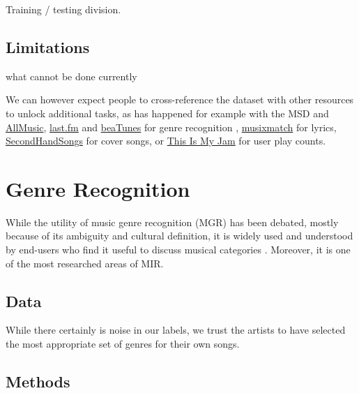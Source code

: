 \documentclass{article}
\newcommand{\todo}[1]{{\color{red} #1 }}
\begin{document}
Training / testing division.

\subsection{Limitations}

\todo{what cannot be done currently}

We can however expect people to cross-reference the dataset with other resources to unlock additional tasks, as has happened for example with the MSD and \href{http://www.allmusic.com}{AllMusic}, \href{https://www.last.fm}{last.fm} and \href{https://beatunes.com}{beaTunes} for genre recognition \cite{msd_features, msd_genres}, \href{https://musixmatch.com}{musixmatch} for lyrics, \href{https://secondhandsongs.com}{SecondHandSongs} for cover songs, or \href{https://www.thisismyjam.com}{This Is My Jam} for user play counts.


\section{Genre Recognition} %


While the utility of music genre recognition (MGR) has been debated, mostly because of its ambiguity and cultural definition, it is widely used and understood by end-users who find it useful to discuss musical categories \cite{mgr_why}. Moreover, it is one of the most researched areas of MIR.

\subsection{Data}

While there certainly is noise in our labels, we trust the artists to have selected the most appropriate set of genres for their own songs.


\subsection{Methods}
\end{document}
